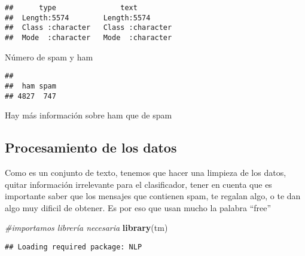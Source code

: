 \documentclass[]{article}
\newenvironment{Shaded}{\begin{snugshade}}{\end{snugshade}}
\newcommand{\KeywordTok}[1]{\textcolor[rgb]{0.13,0.29,0.53}{\textbf{#1}}}
\newcommand{\CommentTok}[1]{\textcolor[rgb]{0.56,0.35,0.01}{\textit{#1}}}
\newcommand{\OperatorTok}[1]{\textcolor[rgb]{0.81,0.36,0.00}{\textbf{#1}}}
\newcommand{\NormalTok}[1]{#1}
\begin{document}
\begin{verbatim}
##      type               text          
##  Length:5574        Length:5574       
##  Class :character   Class :character  
##  Mode  :character   Mode  :character
\end{verbatim}

Número de spam y ham

\begin{Shaded}
\end{Shaded}

\begin{verbatim}
## 
##  ham spam 
## 4827  747
\end{verbatim}

Hay más información sobre ham que de spam

\subsection{Procesamiento de los
datos}\label{procesamiento-de-los-datos}

Como es un conjunto de texto, tenemos que hacer una limpieza de los
datos, quitar información irrelevante para el clasificador, tener en
cuenta que es importante saber que los mensajes que contienen spam, te
regalan algo, o te dan algo muy dificil de obtener. Es por eso que usan
mucho la palabra ``free''

\begin{Shaded}
\begin{Highlighting}[]
\CommentTok{#importamos librería necesaria}
\KeywordTok{library}\NormalTok{(tm)}
\end{Highlighting}
\end{Shaded}

\begin{verbatim}
## Loading required package: NLP
\end{verbatim}

\begin{Shaded}
\end{Shaded}
\end{document}

